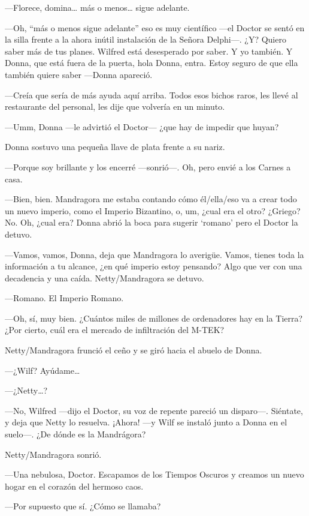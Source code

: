 ---Florece, domina\ldots{} más o menos\ldots{} sigue adelante.

---Oh, ``más o menos sigue adelante'' eso es muy científico ---el Doctor
se sentó en la silla frente a la ahora inútil instalación de la Señora
Delphi---. ¿Y? Quiero saber más de tus planes. Wilfred está desesperado
por saber. Y yo también. Y Donna, que está fuera de la puerta, hola
Donna, entra. Estoy seguro de que ella también quiere saber ---Donna
apareció.

---Creía que sería de más ayuda aquí arriba. Todos esos bichos raros,
les llevé al restaurante del personal, les dije que volvería en un
minuto.

---Umm, Donna ---le advirtió el Doctor--- ¿que hay de impedir que
huyan?

Donna sostuvo una pequeña llave de plata frente a su nariz.

---Porque soy brillante y los encerré ---sonrió---. Oh, pero envié a los
Carnes a casa.

---Bien, bien. Mandragora me estaba contando cómo él/ella/eso va a crear
todo un nuevo imperio, como el Imperio Bizantino, o, um, ¿cual era el
otro? ¿Griego? No. Oh, ¿cual era? Donna abrió la boca para sugerir
`romano' pero el Doctor la detuvo.

---Vamos, vamos, Donna, deja que Mandragora lo averigüe. Vamos, tienes
toda la información a tu alcance, ¿en qué imperio estoy pensando? Algo
que ver con una decadencia y una caída. Netty/Mandragora se detuvo.

---Romano. El Imperio Romano.

---Oh, sí, muy bien. ¿Cuántos miles de millones de ordenadores hay en la
Tierra? ¿Por cierto, cuál era el mercado de infiltración del M-TEK?

Netty/Mandragora frunció el ceño y se giró hacia el abuelo de Donna.

---¿Wilf? Ayúdame\ldots{}

---¿Netty\ldots{}?

---No, Wilfred ---dijo el Doctor, su voz de repente pareció un
disparo---. Siéntate, y deja que Netty lo resuelva. ¡Ahora! ---y Wilf se
instaló junto a Donna en el suelo---. ¿De dónde es la Mandrágora?

Netty/Mandragora sonrió.

---Una nebulosa, Doctor. Escapamos de los Tiempos Oscuros y creamos un
nuevo hogar en el corazón del hermoso caos.

---Por supuesto que sí. ¿Cómo se llamaba?

